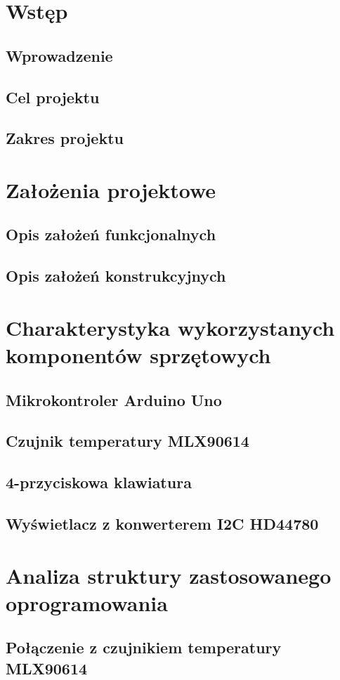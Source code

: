 \chapter{Wstęp}
    \section{Wprowadzenie}
    \section{Cel projektu}
    \section{Zakres projektu}
\chapter{Założenia projektowe}
    \section{Opis założeń funkcjonalnych}
    \section{Opis założeń konstrukcyjnych}
\chapter{Charakterystyka wykorzystanych komponentów sprzętowych}
    \section{Mikrokontroler Arduino Uno}
    \section{Czujnik temperatury MLX90614}
    \section{4-przyciskowa klawiatura}
    \section{Wyświetlacz z konwerterem I2C HD44780}
\chapter{Analiza struktury zastosowanego oprogramowania}
    \section{Połączenie z czujnikiem temperatury MLX90614}
